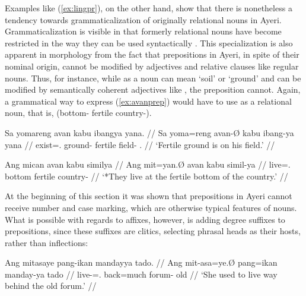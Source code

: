 Examples like (\ref{ex:lingpr}), on the other hand, show that there is 
nonetheless a tendency towards grammaticalization of originally relational 
nouns in Ayeri. Grammaticalization is visible in that formerly relational nouns 
have become restricted in the way they can be used syntactically 
\citep[174]{lehmann2015}. This specialization is also apparent in 
morphology from the fact that prepositions in Ayeri, in spite of their nominal 
origin, cannot be modified by adjectives and relative clauses like regular 
nouns. Thus, for instance, while  as a noun can mean 
`soil' or `ground' and can be modified by semantically coherent adjectives like 
, the preposition  cannot. Again, a 
grammatical way to express (\ref{ex:avanprep}) would have to use 
 as a relational noun, that is,  
(bottom-\Loc{} fertile country-\Gen{}).

\pex
\a\label{ex:avannn}\begingl
	\gla Sa yomareng avan kabu ibangya yana. //
	\glb Sa yoma=reng avan-Ø kabu ibang-ya yana //
	\glc \PatT{} exist=\TsgI.\AargI{} ground-\Top{} fertile field-\Loc{} 
		\TsgM{}.\Gen{} //
	\glft `Fertile ground is on his field.' //
\endgl

\a\label{ex:avanprep}\ljudge* \begingl
	\gla Ang mican avan kabu similya //
	\glb Ang mit=yan.Ø avan kabu simil-ya //
	\glc \AgtT{} live=\TplM{}.\Top{} bottom fertile country-\Loc{} //
	\glft `*They live at the fertile bottom of the country.' //
\endgl

\xe

At the beginning of this section it was shown that prepositions in Ayeri cannot 
receive number and case marking, which are otherwise typical features of nouns. 
What is possible with regards to affixes, however, is adding degree suffixes to 
prepositions, since these suffixes are clitics, selecting phrasal heads as 
their hosts, rather than inflections:

\ex\begingl
	\gla Ang mitasaye pang-ikan mandayya tado. //
	\glb Ang mit-asa=ye.Ø pang=ikan manday-ya tado //
	\glc \AgtT{} live-\Hab{}=\TsgF{}.\Top{} back=much forum-\Loc{} old //
	\glft `She used to live way behind the old forum.' //
\endgl\xe

